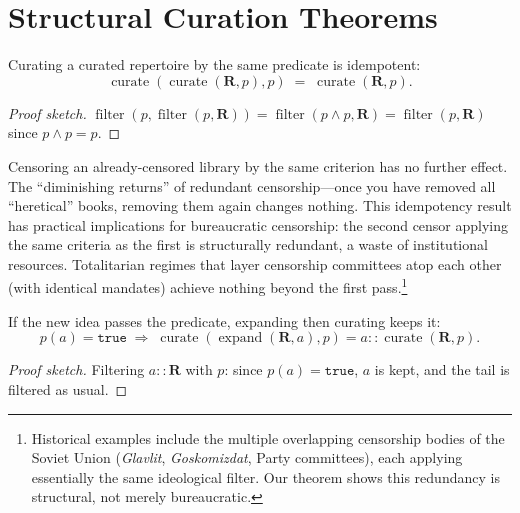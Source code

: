 \section{Structural Curation Theorems}
\label{sec:ch15-structural}

\begin{theorem}
\label{thm:curate-idempotent}
Curating a curated repertoire by the same predicate is idempotent:
\[
  \operatorname{curate}(\operatorname{curate}(\mathbf{R}, p), p)
  \;=\;
  \operatorname{curate}(\mathbf{R}, p).
\]
\end{theorem}

\begin{proof}[Proof sketch]
$\operatorname{filter}(p, \operatorname{filter}(p, \mathbf{R}))
= \operatorname{filter}(p \wedge p, \mathbf{R})
= \operatorname{filter}(p, \mathbf{R})$
since $p \wedge p = p$.
\end{proof}

Censoring an already-censored library by the same criterion has no further
effect.  The ``diminishing returns'' of redundant censorship---once you have
removed all ``heretical'' books, removing them again changes nothing.  This
idempotency result has practical implications for bureaucratic censorship:
the second censor applying the same criteria as the first is structurally
redundant, a waste of institutional resources.  Totalitarian regimes that
layer censorship committees atop each other (with identical mandates) achieve
nothing beyond the first pass.\footnote{Historical examples include the
multiple overlapping censorship bodies of the Soviet Union (\textit{Glavlit},
\textit{Goskomizdat}, Party committees), each applying essentially the same
ideological filter.  Our theorem shows this redundancy is structural, not
merely bureaucratic.}

\begin{theorem}
\label{thm:expand-curate-accept}
If the new idea passes the predicate, expanding then curating keeps it:
\[
  p(a) = \texttt{true}
  \;\Longrightarrow\;
  \operatorname{curate}(\operatorname{expand}(\mathbf{R}, a), p)
  = a :: \operatorname{curate}(\mathbf{R}, p).
\]
\end{theorem}

\begin{proof}[Proof sketch]
Filtering $a :: \mathbf{R}$ with $p$: since $p(a) = \texttt{true}$,
$a$ is kept, and the tail is filtered as usual.
\end{proof}

